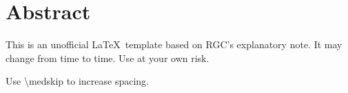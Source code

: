 \section{Abstract}
\smallskip

This is an unofficial \LaTeX~template based on RGC's explanatory note.
It may change from time to time. Use at your own risk.

Use \textbackslash medskip to increase spacing.
\blindtext

\medskip

\blindtext